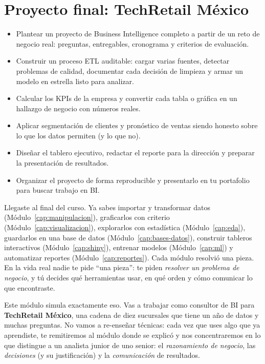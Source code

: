 \chapter{Proyecto final: TechRetail México}
\label{cap:proyecto}

\begin{objetivos}
\begin{itemize}
  \item Plantear un proyecto de Business Intelligence completo a partir de un
        reto de negocio real: preguntas, entregables, cronograma y criterios
        de evaluación.
  \item Construir un proceso ETL auditable: cargar varias fuentes, detectar
        problemas de calidad, documentar cada decisión de limpieza y armar un
        modelo en estrella listo para analizar.
  \item Calcular los KPIs de la empresa y convertir cada tabla o gráfica en
        un hallazgo de negocio con números reales.
  \item Aplicar segmentación de clientes y pronóstico de ventas siendo honesto
        sobre lo que los datos permiten (y lo que no).
  \item Diseñar el tablero ejecutivo, redactar el reporte para la dirección y
        preparar la presentación de resultados.
  \item Organizar el proyecto de forma reproducible y presentarlo en tu
        portafolio para buscar trabajo en BI.
\end{itemize}
\end{objetivos}

Llegaste al final del curso. Ya sabes importar y transformar datos
(Módulo~\ref{cap:manipulacion}), graficarlos con criterio
(Módulo~\ref{cap:visualizacion}), explorarlos con estadística
(Módulo~\ref{cap:eda}), guardarlos en una base de datos
(Módulo~\ref{cap:bases-datos}), construir tableros interactivos
(Módulo~\ref{cap:shiny}), entrenar modelos (Módulo~\ref{cap:ml}) y
automatizar reportes (Módulo~\ref{cap:reportes}). Cada módulo resolvió una
pieza. En la vida real nadie te pide ``una pieza'': te piden \emph{resolver un
problema de negocio}, y tú decides qué herramientas usar, en qué orden y cómo
comunicar lo que encontraste.

Este módulo simula exactamente eso. Vas a trabajar como consultor de BI para
\textbf{TechRetail México}, una cadena de diez sucursales que tiene un año de
datos y muchas preguntas. No vamos a re-enseñar técnicas: cada vez que uses
algo que ya aprendiste, te remitiremos al módulo donde se explicó y nos
concentraremos en lo que distingue a un analista junior de uno senior: el
\emph{razonamiento de negocio}, las \emph{decisiones} (y su justificación) y la
\emph{comunicación} de resultados.

